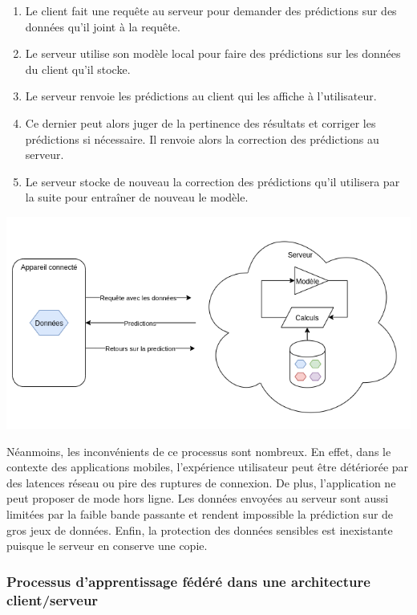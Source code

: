 \documentclass{article}
\begin{document}
\begin{enumerate}
    \item Le client fait une requête au serveur pour demander des prédictions sur des données qu'il joint à la requête.
    \item Le serveur utilise son modèle local pour faire des prédictions sur les données du client qu'il stocke.
    \item Le serveur renvoie les prédictions au client qui les affiche à l'utilisateur.
    \item Ce dernier peut alors juger de la pertinence des résultats et corriger les prédictions si nécessaire. Il renvoie alors la correction des prédictions au serveur.
    \item Le serveur stocke de nouveau la correction des prédictions qu'il utilisera par la suite pour entraîner de nouveau le modèle.
\end{enumerate}

\centerline{\includegraphics[width=14cm]{centralize.png}}

Néanmoins, les inconvénients de ce processus sont nombreux. En effet, dans le contexte des applications mobiles, l'expérience utilisateur peut être détériorée par des latences réseau ou pire des ruptures de connexion. De plus, l'application ne peut proposer de mode hors ligne. Les données envoyées au serveur sont aussi limitées par la faible bande passante et rendent impossible la prédiction sur de gros jeux de données. Enfin, la protection des données sensibles est inexistante puisque le serveur en conserve une copie. 

\subsubsection{Processus d'apprentissage fédéré dans une architecture client/serveur}
\end{document}
